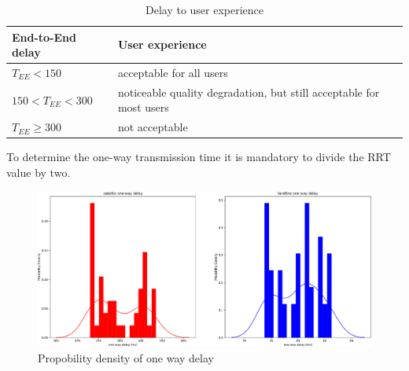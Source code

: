 \documentclass[parskip=full]{scrartcl}
\begin{document}
\begin{table}[hb]
	\centering
	\begin{tabular}{ll}
		\toprule
		\textbf{End-to-End delay} & \textbf{User experience} \\ \midrule
			$T_{EE} < 150$ & acceptable for all users \\
			$150 < T_{EE} < 300$ & noticeable quality degradation, but still acceptable for most users\\
			$T_{EE} \geq 300$ & not acceptable\\
			\bottomrule
		\end{tabular}
		\caption{Delay to user experience}
		\label{tab:delayEnd2End}
	\end{table}
	
To determine the one-way transmission time it is mandatory to divide the RRT value by two.

\begin{figure}[!ht]
	\centering %
	\includegraphics[width=\textwidth]{images/oneWayDelay.pdf} %
	\caption{Propobility density of one way delay} 
	\label{fig:one-way-delay} %
\end{figure}
\end{document}
